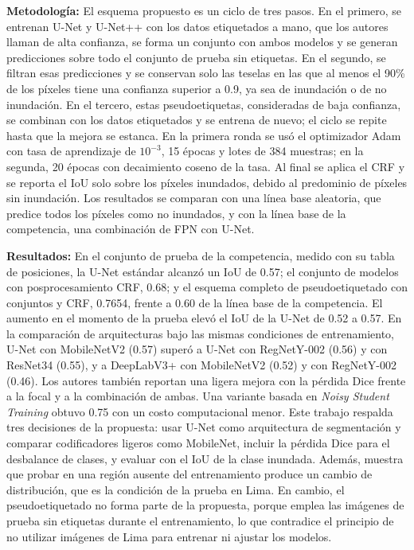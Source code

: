 \documentclass[conference]{IEEEtran}
\begin{document}
\textbf{Metodología:} El esquema propuesto es un ciclo de tres pasos. En el primero, se entrenan U-Net y U-Net++ con los datos etiquetados a mano, que los autores llaman de alta confianza, se forma un conjunto con ambos modelos y se generan predicciones sobre todo el conjunto de prueba sin etiquetas. En el segundo, se filtran esas predicciones y se conservan solo las teselas en las que al menos el 90\% de los píxeles tiene una confianza superior a 0.9, ya sea de inundación o de no inundación. En el tercero, estas pseudoetiquetas, consideradas de baja confianza, se combinan con los datos etiquetados y se entrena de nuevo; el ciclo se repite hasta que la mejora se estanca. En la primera ronda se usó el optimizador Adam con tasa de aprendizaje de $10^{-3}$, 15 épocas y lotes de 384 muestras; en la segunda, 20 épocas con decaimiento coseno de la tasa. Al final se aplica el CRF y se reporta el IoU solo sobre los píxeles inundados, debido al predominio de píxeles sin inundación. Los resultados se comparan con una línea base aleatoria, que predice todos los píxeles como no inundados, y con la línea base de la competencia, una combinación de FPN con U-Net.
 
\textbf{Resultados:} En el conjunto de prueba de la competencia, medido con su tabla de posiciones, la U-Net estándar alcanzó un IoU de 0.57; el conjunto de modelos con posprocesamiento CRF, 0.68; y el esquema completo de pseudoetiquetado con conjuntos y CRF, 0.7654, frente a 0.60 de la línea base de la competencia. El aumento en el momento de la prueba elevó el IoU de la U-Net de 0.52 a 0.57. En la comparación de arquitecturas bajo las mismas condiciones de entrenamiento, U-Net con MobileNetV2 (0.57) superó a U-Net con RegNetY-002 (0.56) y con ResNet34 (0.55), y a DeepLabV3+ con MobileNetV2 (0.52) y con RegNetY-002 (0.46). Los autores también reportan una ligera mejora con la pérdida Dice frente a la focal y a la combinación de ambas. Una variante basada en \textit{Noisy Student Training} obtuvo 0.75 con un costo computacional menor. Este trabajo respalda tres decisiones de la propuesta: usar U-Net como arquitectura de segmentación y comparar codificadores ligeros como MobileNet, incluir la pérdida Dice para el desbalance de clases, y evaluar con el IoU de la clase inundada. Además, muestra que probar en una región ausente del entrenamiento produce un cambio de distribución, que es la condición de la prueba en Lima. En cambio, el pseudoetiquetado no forma parte de la propuesta, porque emplea las imágenes de prueba sin etiquetas durante el entrenamiento, lo que contradice el principio de no utilizar imágenes de Lima para entrenar ni ajustar los modelos.
\end{document}
